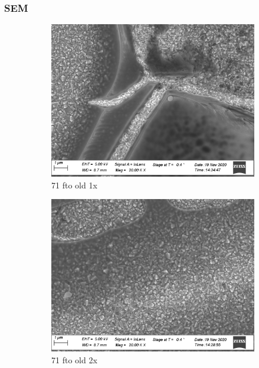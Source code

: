 \subsubsection{SEM}
\begin{figure}
    \centering
    \begin{subfigure}{.45\textwidth}
        \centering
        \includegraphics[width=.8\textwidth]{Pics/sem/071_fto_old_1x.png}
        \caption{71 fto old 1x} \label{fig:sem-old1}
    \end{subfigure}
    \begin{subfigure}{.45\textwidth}
        \centering
        \includegraphics[width=.8\textwidth]{Pics/sem/071_fto_old_2x.png}
        \caption{71 fto old 2x} \label{fig:sem-old2}
    \end{subfigure}
    \begin{subfigure}{.45\textwidth}
        \centering

\end{subfigure}
\end{figure}
